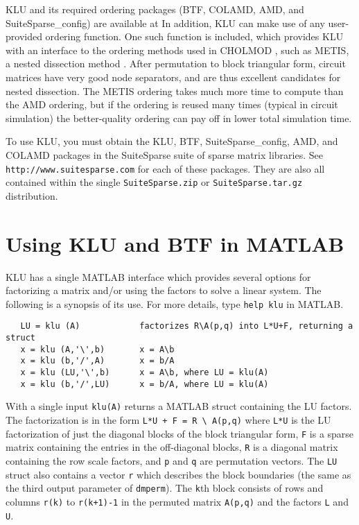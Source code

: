 \documentclass[11pt]{article}
\begin{document}
KLU and its required ordering packages (BTF, COLAMD, AMD, and
SuiteSparse\_config) are
available at   In
addition, KLU can make use of any user-provided ordering function.  One such
function is included, which provides KLU with an interface to the ordering
methods used in CHOLMOD \cite{ChenDavisHagerRajamanickam06}, such as METIS, a
nested dissection method \cite{KarypisKumar98e}.  After permutation to block
triangular form, circuit matrices have very good node separators, and are thus
excellent candidates for nested dissection.  The METIS ordering takes much more
time to compute than the AMD ordering, but if the ordering is reused many times
(typical in circuit simulation) the better-quality ordering can pay off in
lower total simulation time. 

To use KLU, you must obtain the KLU, BTF, SuiteSparse\_config,
AMD, and COLAMD packages
in the SuiteSparse suite of sparse matrix libraries.  See 
{\tt http://www.suitesparse.com} for each of these packages.
They are also all contained within the single {\tt SuiteSparse.zip} or
{\tt SuiteSparse.tar.gz} distribution.

\section{Using KLU and BTF in MATLAB}

KLU has a single MATLAB interface which provides several options for factorizing
a matrix and/or using the factors to solve a linear system.  The following is
a synopsis of its use.  For more details, type {\tt help klu} in MATLAB.

{\footnotesize
\begin{verbatim}
   LU = klu (A)            factorizes R\A(p,q) into L*U+F, returning a struct
   x = klu (A,'\',b)       x = A\b
   x = klu (b,'/',A)       x = b/A
   x = klu (LU,'\',b)      x = A\b, where LU = klu(A)
   x = klu (b,'/',LU)      x = b/A, where LU = klu(A)
\end{verbatim}
}

With a single input {\tt klu(A)} returns a MATLAB struct containing the LU
factors.  The factorization is in the form \verb'L*U + F = R \ A(p,q)'
where {\tt L*U} is the LU factorization of just the diagonal blocks of the
block triangular form, {\tt F} is a sparse matrix containing the entries in
the off-diagonal blocks, {\tt R} is a diagonal matrix containing the row
scale factors, and {\tt p} and {\tt q} are permutation vectors.  The {\tt LU}
struct also contains a vector {\tt r} which describes the block boundaries
(the same as the third output parameter of {\tt dmperm}).  The {\tt k}th
block consists of rows and columns {\tt r(k)} to {\tt r(k+1)-1} in the
permuted matrix {\tt A(p,q)} and the factors {\tt L} and {\tt U}.
\end{document}
